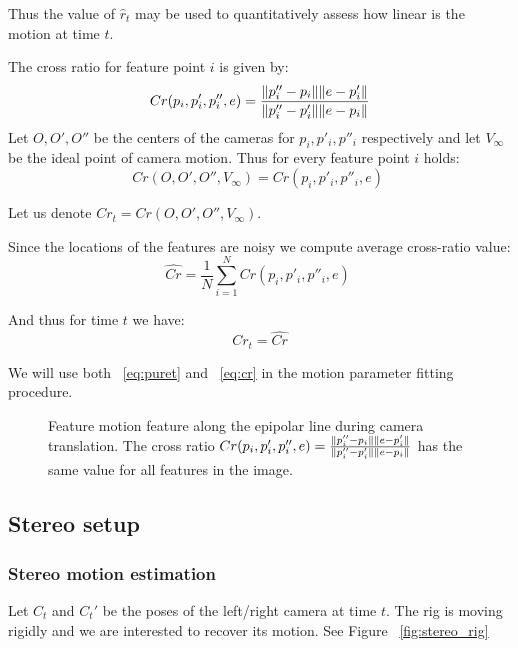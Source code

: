 \documentclass[10pt]{article}         %
\DeclarePairedDelimiter\norm{\lVert}{\rVert}%
\begin{document}
Thus the value of $\hat{r}_t$ may be used to quantitatively assess how
linear is the motion at time $t$.

The cross ratio for feature point $i$ is given by:
\[
Cr(p_i,p'_i,p''_i,e) =
\frac{\norm{p''_i-p_i}\norm{e-p'_i}}{\norm{p''_i-p'_i}\norm{e-p_i}}
\]
Let $O,O',O''$ be the centers of the cameras for $p_i,p'_i,p''_i$
respectively and let $V_\infty$ be the ideal point of camera motion.
Thus for every feature point $i$ holds:
\[
Cr(O,O',O'',V_{\infty}) = Cr(p_i,p'_i,p''_i,e) \;
\]

Let us denote $Cr_t = Cr(O,O',O'',V_{\infty})$.

Since the locations of the features are noisy we compute average
cross-ratio value:
\[
\hat{Cr} =  \frac{1}{N}\sum_{i=1}^NCr(p_i,p'_i,p''_i,e) \;
\]

And thus for time $t$ we have:
\begin{equation}\label{eq:cr}
  Cr_t = \hat{Cr}
\end{equation}

We will use both ~\ref{eq:puret} and ~\ref{eq:cr} in the motion
parameter fitting procedure.

\begin{figure}[!h]
  \centering
  \caption{Feature motion feature along the epipolar line during
    camera translation.  The cross ratio $Cr(p_i,p'_i,p''_i,e) =
    \frac{\norm{p''_i-p_i}\norm{e-p'_i}}{\norm{p''_i-p'_i}\norm{e-p_i}}$
    has the same value for all features in the image.}
  \label{fig:cross_ratio}
\end{figure}

\subsection{Stereo setup}

\subsubsection{Stereo motion estimation}
Let $C_t$ and $C_t'$ be the poses of the left/right camera at time
$t$. The rig is moving rigidly and we are interested to recover its
motion. See Figure ~\ref{fig:stereo_rig}
\end{document}
